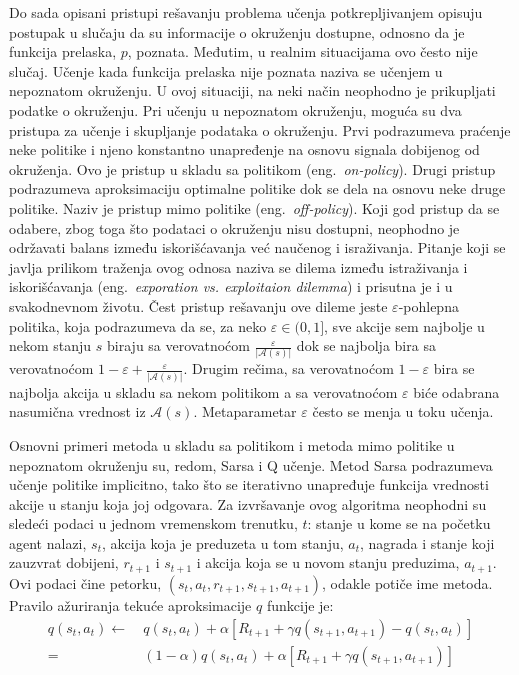Do sada opisani pristupi rešavanju problema učenja potkrepljivanjem opisuju postupak u slučaju da su informacije o okruženju dostupne, odnosno da je funkcija prelaska, $p$, poznata. Međutim, u realnim situacijama ovo često nije slučaj. Učenje kada funkcija prelaska nije poznata naziva se učenjem u nepoznatom okruženju. U ovoj situaciji, na neki način neophodno je prikupljati podatke o okruženju. Pri učenju u nepoznatom okruženju, moguća su dva pristupa za učenje i skupljanje podataka o okruženju. Prvi podrazumeva praćenje neke politike i njeno konstantno unapređenje na osnovu signala dobijenog od okruženja. Ovo je pristup u skladu sa politikom (eng.~{\em on-policy}). Drugi pristup podrazumeva aproksimaciju optimalne politike dok se dela na osnovu neke druge politike. Naziv je pristup mimo politike (eng.~{\em off-policy}). Koji god pristup da se odabere, zbog toga što podataci o okruženju nisu dostupni, neophodno je održavati balans između iskorišćavanja već naučenog i israživanja. Pitanje koji se javlja prilikom traženja ovog odnosa naziva se dilema između istraživanja i iskorišćavanja (eng.~{\em exporation vs. exploitaion dilemma}) i prisutna je i u svakodnevnom životu. Čest pristup rešavanju ove dileme jeste $\varepsilon$-pohlepna politika, koja podrazumeva da se, za neko $\varepsilon \in (0,1]$, sve akcije sem najbolje u nekom stanju $s$ biraju sa verovatnoćom $\frac{\varepsilon}{|\mathcal{A}(s)|}$ dok se najbolja bira sa verovatnoćom $1- \varepsilon + \frac{\varepsilon}{|\mathcal{A}(s)|}$. Drugim rečima, sa verovatnoćom $1-\varepsilon$ bira se najbolja akcija u skladu sa nekom politikom a sa verovatnoćom $\varepsilon$ biće odabrana nasumična vrednost iz $\mathcal{A}(s)$. Metaparametar $\varepsilon$ često se menja u toku učenja.
\par 
Osnovni primeri metoda u skladu sa politikom i metoda mimo politike u nepoznatom okruženju su, redom, Sarsa i Q učenje. Metod Sarsa podrazumeva učenje politike implicitno, tako što se iterativno unapređuje funkcija vrednosti akcije u stanju koja joj odgovara. Za izvršavanje ovog algoritma neophodni su sledeći podaci u jednom vremenskom trenutku, $t$: stanje u kome se na početku agent nalazi, $s_t$, akcija koja je preduzeta u tom stanju, $a_t$, nagrada i stanje koji zauzvrat dobijeni, $r_{t+1}$ i $s_{t+1}$ i akcija koja se u novom stanju preduzima, $a_{t+1}$. Ovi podaci čine petorku, $(s_t, a_t, r_{t+1}, s_{t+1}, a_{t+1})$, odakle potiče ime metoda. Pravilo ažuriranja tekuće aproksimacije $q$ funkcije je:
\begin{equation}
	\begin{aligned}
		q(s_t, a_t) \leftarrow& ~q(s_t, a_t) + \alpha [ R_{t+1} + \gamma q(s_{t+1}, a_{t+1}) - q(s_t, a_t)] \\
					=&~ (1-\alpha)q(s_t, a_t) + \alpha [ R_{t+1} + \gamma q(s_{t+1}, a_{t+1}) ]
	\end{aligned}
\end{equation}

